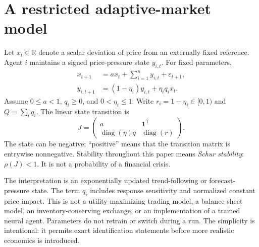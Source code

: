 \documentclass[11pt]{article}
\theoremstyle{remark}\newtheorem{remark}[theorem]{Remark}
\newcommand{\R}{\mathbb{R}}
\newcommand{\ee}{\varepsilon}
\begin{document}
\section{A restricted adaptive-market model}\label{sec:model}
Let $x_t\in\R$ denote a scalar deviation of price from an externally fixed reference. Agent $i$ maintains a signed price-pressure state $y_{i,t}$. For fixed parameters,
\begin{align}
 x_{t+1}&=a x_t+\sum_{i=1}^{n} y_{i,t}+\ee_{t+1},\label{eq:market}\\
 y_{i,t+1}&=(1-\eta_i)y_{i,t}+\eta_i q_i x_t.\label{eq:learn}
\end{align}
Assume $0\le a<1$, $q_i\ge0$, and $0<\eta_i\le1$. Write $r_i=1-\eta_i\in[0,1)$ and $Q=\sum_iq_i$. The linear state transition is
\begin{equation}
 J=\begin{pmatrix}
 a&\mathbf1^{\mathsf T}\\
 \operatorname{diag}(\eta)q&\operatorname{diag}(r)
 \end{pmatrix}.\label{eq:J}
\end{equation}
The state can be negative; ``positive'' means that the transition matrix is entrywise nonnegative. Stability throughout this paper means \emph{Schur stability}: $\rho(J)<1$. It is not a probability of a financial crisis.

The interpretation is an exponentially updated trend-following or forecast-pressure state. The term $q_i$ includes response sensitivity and normalized constant price impact. This is not a utility-maximizing trading model, a balance-sheet model, an inventory-conserving exchange, or an implementation of a trained neural agent. Parameters do not retrain or switch during a run. The simplicity is intentional: it permits exact identification statements before more realistic economics is introduced.
\end{document}
